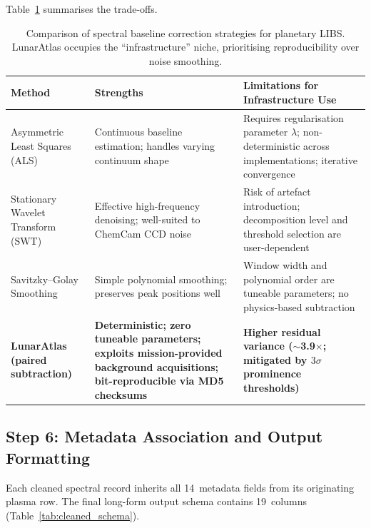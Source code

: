 \documentclass[a4paper,twocolumn,10pt]{article}
\begin{document}
Table~\ref{tab:method_comp} summarises the trade-offs.

\begin{table}[!t]
\centering
\caption{Comparison of spectral baseline correction strategies for
  planetary LIBS.  LunarAtlas occupies the ``infrastructure'' niche,
  prioritising reproducibility over noise smoothing.}
\label{tab:method_comp}
\begin{tabularx}{\textwidth}{l X X}
\toprule
\textbf{Method} & \textbf{Strengths} & \textbf{Limitations for Infrastructure Use} \\
\midrule
Asymmetric Least Squares (ALS)~\cite{Clegg2017} & Continuous baseline estimation;
  handles varying continuum shape & Requires regularisation parameter
  $\lambda$; non-deterministic across implementations; iterative convergence \\
\addlinespace
Stationary Wavelet Transform (SWT)~\cite{Anderson2022} & Effective high-frequency
  denoising; well-suited to ChemCam CCD noise & Risk of artefact introduction;
  decomposition level and threshold selection are user-dependent \\
\addlinespace
Savitzky--Golay Smoothing~\cite{Sridhar2025} & Simple polynomial smoothing;
  preserves peak positions well & Window width and polynomial order
  are tuneable parameters; no physics-based subtraction \\
\addlinespace
\textbf{LunarAtlas (paired subtraction)} & \textbf{Deterministic;
  zero tuneable parameters; exploits mission-provided background
  acquisitions; bit-reproducible via MD5 checksums} & \textbf{Higher residual
  variance ($\sim$3.9$\times$; mitigated by $3\sigma$ prominence thresholds)} \\
\bottomrule
\end{tabularx}
\end{table}

\subsection{Step 6: Metadata Association and Output Formatting}

Each cleaned spectral record inherits all 14~metadata fields from its
originating plasma row.  The final long-form output schema contains
19~columns (Table~\ref{tab:cleaned_schema}).
\end{document}
